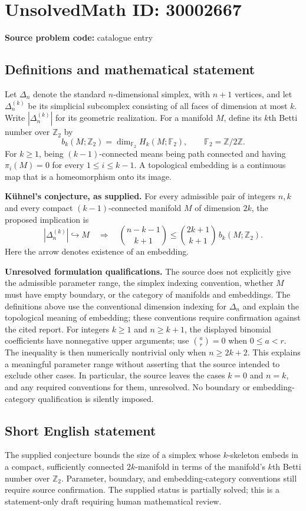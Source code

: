 \documentclass[11pt]{article}
\begin{document}
\section*{UnsolvedMath ID: 30002667}
\textbf{Source problem code:} catalogue entry
\subsection{Definitions and mathematical statement}
Let \(\Delta_n\) denote the standard \(n\)-dimensional simplex, with \(n+1\) vertices, and let \(\Delta_n^{(k)}\) be its simplicial subcomplex consisting of all faces of dimension at most \(k\). Write \(|\Delta_n^{(k)}|\) for its geometric realization. For a manifold \(M\), define its \(k\)th Betti number over \(\mathbb Z_2\) by
\[
b_k(M;\mathbb Z_2)=\dim_{\mathbb F_2}H_k(M;\mathbb F_2),
\qquad \mathbb F_2=\mathbb Z/2\mathbb Z.
\]
For \(k\geq1\), being \((k-1)\)-connected means being path connected and having \(\pi_i(M)=0\) for every \(1\leq i\leq k-1\). A topological embedding is a continuous map that is a homeomorphism onto its image.

\textbf{Kühnel's conjecture, as supplied.} For every admissible pair of integers \(n,k\) and every compact \((k-1)\)-connected manifold \(M\) of dimension \(2k\), the proposed implication is
\[
|\Delta_n^{(k)}|\hookrightarrow M
\quad\Longrightarrow\quad
\binom{n-k-1}{k+1}
\leq
\binom{2k+1}{k+1}\,b_k(M;\mathbb Z_2).
\]
Here the arrow denotes existence of an embedding.

\textbf{Unresolved formulation qualifications.} The source does not explicitly give the admissible parameter range, the simplex indexing convention, whether \(M\) must have empty boundary, or the category of manifolds and embeddings. The definitions above use the conventional dimension indexing for \(\Delta_n\) and explain the topological meaning of embedding; these conventions require confirmation against the cited report. For integers \(k\geq1\) and \(n\geq k+1\), the displayed binomial coefficients have nonnegative upper arguments; use \(\binom{a}{r}=0\) when \(0\leq a<r\). The inequality is then numerically nontrivial only when \(n\geq2k+2\). This explains a meaningful parameter range without asserting that the source intended to exclude other cases. In particular, the source leaves the cases \(k=0\) and \(n=k\), and any required conventions for them, unresolved. No boundary or embedding-category qualification is silently imposed.
\subsection{Short English statement}
The supplied conjecture bounds the size of a simplex whose \(k\)-skeleton embeds in a compact, sufficiently connected \(2k\)-manifold in terms of the manifold's \(k\)th Betti number over \(\mathbb Z_2\). Parameter, boundary, and embedding-category conventions still require source confirmation. The supplied status is partially solved; this is a statement-only draft requiring human mathematical review.
\end{document}
